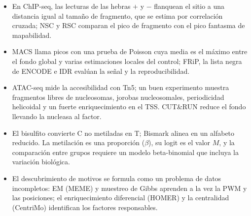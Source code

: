 \begin{resumen}
\begin{itemize}
  \item En ChIP-seq, las lecturas de las hebras $+$ y $-$ flanquean el sitio a una distancia igual al tamaño de fragmento, que se estima por correlación cruzada; NSC y RSC comparan el pico de fragmento con el pico fantasma de mapabilidad.
  \item MACS llama picos con una prueba de Poisson cuya media es el máximo entre el fondo global y varias estimaciones locales del control; FRiP, la lista negra de ENCODE e IDR evalúan la señal y la reproducibilidad.
  \item ATAC-seq mide la accesibilidad con Tn5; un buen experimento muestra fragmentos libres de nucleosomas, jorobas nucleosomales, periodicidad helicoidal y un fuerte enriquecimiento en el TSS. CUT\&RUN reduce el fondo llevando la nucleasa al factor.
  \item El bisulfito convierte C no metiladas en T; Bismark alinea en un alfabeto reducido. La metilación es una proporción ($\beta$), su logit es el valor $M$, y la comparación entre grupos requiere un modelo beta-binomial que incluya la variación biológica.
  \item El descubrimiento de motivos se formula como un problema de datos incompletos: EM (MEME) y muestreo de Gibbs aprenden a la vez la PWM y las posiciones; el enriquecimiento diferencial (HOMER) y la centralidad (CentriMo) identifican los factores responsables.
\end{itemize}
\end{resumen}

